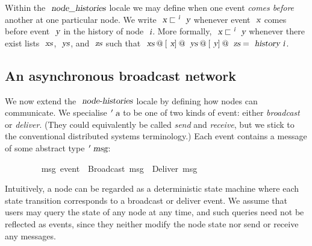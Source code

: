 Within the $\isa{node{\isacharunderscore}histories}$ locale we may define when one event \emph{comes before} another at one particular node.
We write $\isa{x} \sqsubset^\isa{i} \isa{y}$ whenever event $\isa{x}$ comes before event $\isa{y}$ in the history of node $\isa{i}$.
More formally, $\isa{x} \sqsubset^\isa{i} \isa{y}$ whenever there exist lists $\isa{xs}$, $\isa{ys}$, and $\isa{zs}$ such that $\isa{xs}\mathbin{@}[\isa{x}]\mathbin{@}\isa{ys}\mathbin{@}[\isa{y}]\mathbin{@}\isa{zs} = \isa{history\ i}$.

\subsection{An asynchronous broadcast network}

We now extend the $\isa{node-histories}$ locale by defining how nodes can communicate.
We specialise $\isacharprime\isa{a}$ to be one of two kinds of event: either \emph{broadcast} or \emph{deliver}.
(They could equivalently be called \emph{send} and \emph{receive}, but we stick to the conventional distributed systems terminology.)
Each event contains a message of some abstract type $\isacharprime\isa{msg}$:
\vspace{0.375em}
\begin{isabellebody}
\ \ \ \ \ \ \ \  {\isacharprime}msg\ event\ {\isacharequal}\ Broadcast\ {\isacharprime}msg\ {\isacharbar}\ Deliver\ {\isacharprime}msg
\end{isabellebody}
\vspace{0.375em}
Intuitively, a node can be regarded as a deterministic state machine where each state transition corresponds to a broadcast or deliver event.
We assume that users may query the state of any node at any time, and such queries need not be reflected as events, since they neither modify the node state nor send or receive any messages.

